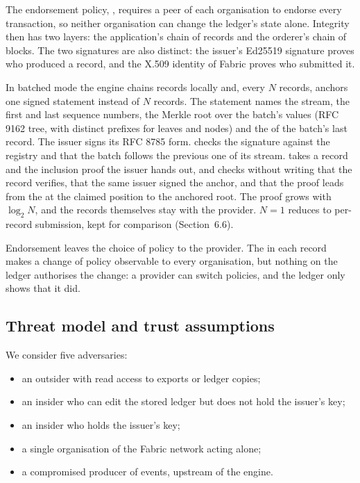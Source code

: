 The endorsement policy, , requires a peer of each organisation to endorse every transaction, so neither organisation can change the ledger's state alone. Integrity then has two layers: the application's chain of records and the orderer's chain of blocks. The two signatures are also distinct: the issuer's Ed25519 signature proves who produced a record, and the X.509 identity of Fabric proves who submitted it.

In batched mode the engine chains records locally and, every $N$ records, anchors one signed statement instead of $N$ records. The statement names the stream, the first and last sequence numbers, the Merkle root over the batch's  values (RFC 9162 tree, with distinct prefixes for leaves and nodes) and the  of the batch's last record. The issuer signs its RFC 8785 form.  checks the signature against the registry and that the batch follows the previous one of its stream.  takes a record and the inclusion proof the issuer hands out, and checks without writing that the record verifies, that the same issuer signed the anchor, and that the proof leads from the  at the claimed position to the anchored root. The proof grows with $\log_2 N$, and the records themselves stay with the provider. $N=1$ reduces to per-record submission, kept for comparison (Section~6.6).

Endorsement leaves the choice of policy to the provider. The  in each record makes a change of policy observable to every organisation, but nothing on the ledger authorises the change: a provider can switch policies, and the ledger only shows that it did.

\subsection{Threat model and trust assumptions}

We consider five adversaries:

\begin{itemize}
\tightlist
\item
  an outsider with read access to exports or ledger copies;
\item
  an insider who can edit the stored ledger but does not hold the issuer's key;
\item
  an insider who holds the issuer's key;
\item
  a single organisation of the Fabric network acting alone;
\item
  a compromised producer of events, upstream of the engine.
\end{itemize}

